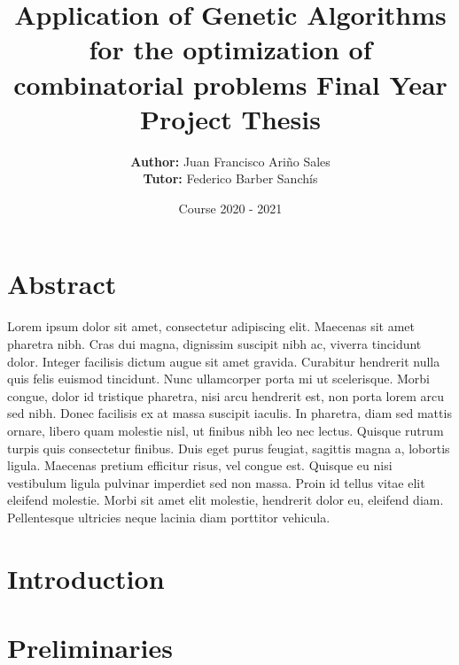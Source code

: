 \documentclass[12pt,twoside]{report}
\title{
	{Application of Genetic Algorithms for the optimization of combinatorial problems}
	{\break \large Final Year Project Thesis}
}
\author{ \textbf{Author:} Juan Francisco Ariño Sales \\ {\large \textbf{Tutor:} Federico Barber Sanchís}}
\date {Course 2020 - 2021}
\begin{document}
\maketitle

\chapter*{Abstract}
\pagestyle{empty}
Lorem ipsum dolor sit amet, consectetur adipiscing elit. Maecenas sit amet pharetra nibh. Cras dui magna, dignissim suscipit nibh ac, viverra tincidunt dolor. Integer facilisis dictum augue sit amet gravida. Curabitur hendrerit nulla quis felis euismod tincidunt. Nunc ullamcorper porta mi ut scelerisque. Morbi congue, dolor id tristique pharetra, nisi arcu hendrerit est, non porta lorem arcu sed nibh. Donec facilisis ex at massa suscipit iaculis. In pharetra, diam sed mattis ornare, libero quam molestie nisl, ut finibus nibh leo nec lectus. Quisque rutrum turpis quis consectetur finibus. Duis eget purus feugiat, sagittis magna a, lobortis ligula. Maecenas pretium efficitur risus, vel congue est. Quisque eu nisi vestibulum ligula pulvinar imperdiet sed non massa. Proin id tellus vitae elit eleifend molestie. Morbi sit amet elit molestie, hendrerit dolor eu, eleifend diam. Pellentesque ultricies neque lacinia diam porttitor vehicula. 

\tableofcontents
\pagestyle{empty}

\chapter{Introduction}


\chapter{Preliminaries}


\appendix

\printbibliography
\end{document}
